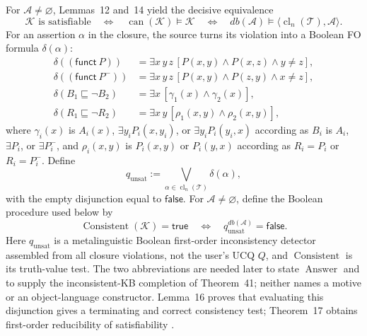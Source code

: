 For \(\mathcal A\ne\varnothing\), Lemmas~12 and~14 yield the decisive
equivalence
\[
 \mathcal K\text{ is satisfiable}
 \quad\Longleftrightarrow\quad
 \operatorname{can}(\mathcal K)\models\mathcal K
 \quad\Longleftrightarrow\quad
 db(\mathcal A)\models
   \langle\operatorname{cl}_n(\mathcal T),\mathcal A\rangle.
\]
For an assertion \(\alpha\) in the closure, the source turns its violation into
a Boolean FO formula \(\delta(\alpha)\):
\[
\begin{aligned}
 \delta((\mathsf{funct}\ P))
   &=\exists x\,y\,z\,[P(x,y)\land P(x,z)\land y\ne z],\\
 \delta((\mathsf{funct}\ P^{-}))
   &=\exists x\,y\,z\,[P(x,y)\land P(z,y)\land x\ne z],\\
 \delta(B_1\sqsubseteq\neg B_2)
   &=\exists x\,[\gamma_1(x)\land\gamma_2(x)],\\
 \delta(R_1\sqsubseteq\neg R_2)
   &=\exists x\,y\,[\rho_1(x,y)\land\rho_2(x,y)],
\end{aligned}
\]
where \(\gamma_i(x)\) is \(A_i(x)\), \(\exists y_iP_i(x,y_i)\), or
\(\exists y_iP_i(y_i,x)\) according as \(B_i\) is \(A_i\), \(\exists P_i\),
or \(\exists P_i^{-}\), and \(\rho_i(x,y)\) is \(P_i(x,y)\) or \(P_i(y,x)\)
according as \(R_i=P_i\) or \(R_i=P_i^{-}\).  Define
\[
 q_{\mathrm{unsat}}
 :=\bigvee_{\alpha\in\operatorname{cl}_n(\mathcal T)}\delta(\alpha),
\]
with the empty disjunction equal to \(\mathsf{false}\).  For
\(\mathcal A\ne\varnothing\), define the Boolean procedure used below by
\[
 \operatorname{Consistent}(\mathcal K)=\mathsf{true}
 \quad\Longleftrightarrow\quad
 q_{\mathrm{unsat}}^{db(\mathcal A)}=\mathsf{false}.
\]
Here \(q_{\mathrm{unsat}}\) is a metalinguistic Boolean first-order
inconsistency detector assembled from all closure violations, not the user's
UCQ \(Q\), and \(\operatorname{Consistent}\) is its truth-value test.  The two
abbreviations are needed later to state \(\operatorname{Answer}\) and to supply
the inconsistent-KB completion of Theorem~41; neither names a motive or an
object-language constructor.  Lemma~16 proves that evaluating this disjunction
gives a terminating and correct consistency test; Theorem~17 obtains
first-order reducibility of satisfiability
\cite[def.~9 and thms.~15--17]{CalvaneseEtAl2007}.

